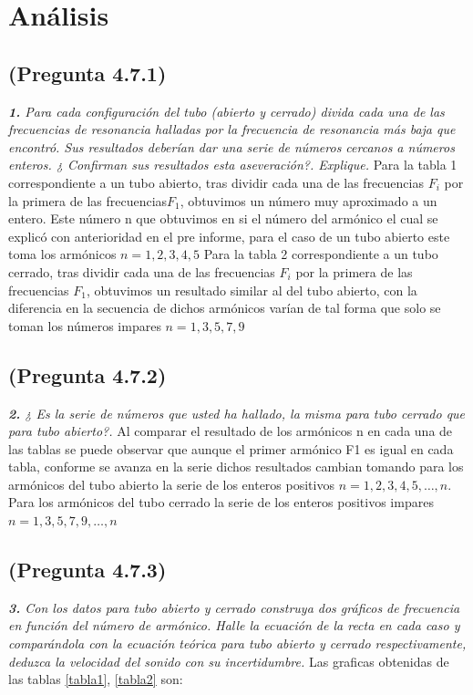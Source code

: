 \documentclass{article}
\begin{document}
\section{Análisis}
\subsection{(Pregunta 4.7.1)}
\textit{\textbf{1.} Para cada configuración del tubo (abierto y cerrado) divida cada una de las frecuencias de resonancia halladas por la frecuencia de resonancia más baja que encontró. Sus resultados deberían dar una serie de números cercanos a números enteros. ¿ Confirman sus resultados esta aseveración?. Explique.}
\newline
Para la tabla 1 correspondiente a un tubo abierto, tras dividir cada una de las frecuencias $F_{i}$ por la primera de las frecuencias$F_{1}$, obtuvimos un número muy aproximado a un entero. Este número n que obtuvimos en si el número del armónico el cual se explicó con anterioridad en el pre informe, para el caso de un tubo abierto este toma los armónicos $n={1,2,3,4,5}$
\newline
Para la tabla 2 correspondiente a un tubo cerrado, tras dividir cada una de las frecuencias  $F_{i}$ por la primera de las frecuencias $F_{1}$, obtuvimos un resultado similar al del tubo abierto, con la diferencia en la secuencia de dichos armónicos varían de tal forma que solo se toman los números impares $n= {1,3,5,7,9}$
\subsection{(Pregunta 4.7.2)}
\textit{\textbf{2.} ¿ Es la serie de números que usted ha hallado, la misma para tubo cerrado que para tubo abierto?.}
\newline
Al comparar el resultado de los armónicos n en cada una de las tablas se puede observar que aunque el primer armónico F1 es igual en cada tabla, conforme se avanza en la serie dichos resultados cambian tomando para los armónicos del tubo abierto la serie de los enteros positivos 
$n={1,2,3,4,5,\ldots,n}$. Para los armónicos del tubo cerrado la serie de los enteros positivos impares $n={1,3,5,7,9,\ldots,n}$

\subsection{(Pregunta 4.7.3)}
\textit{\textbf{3.} Con los datos para tubo abierto y cerrado construya dos gráficos de frecuencia en función del número de armónico. Halle la ecuación de la recta en cada caso y comparándola con la ecuación teórica para tubo abierto y cerrado respectivamente, deduzca la velocidad del sonido con su incertidumbre.}
Las graficas obtenidas de las tablas \ref{tabla1}, \ref{tabla2} son:
\end{document}

